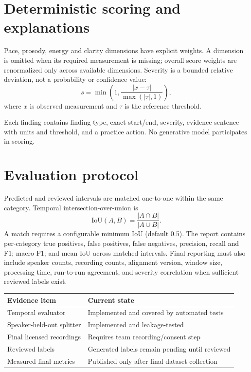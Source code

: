 \documentclass[10pt]{article}
\begin{document}
\section{Deterministic scoring and explanations}
Pace, prosody, energy and clarity dimensions have explicit weights. A dimension is omitted when its required measurement is missing; overall score weights are renormalized only across available dimensions. Severity is a bounded relative deviation, not a probability or confidence value:
\[
s=\min\left(1,\frac{|x-\tau|}{\max(|\tau|,1)}\right),
\]
where $x$ is observed measurement and $\tau$ is the reference threshold.

Each finding contains finding type, exact start/end, severity, evidence sentence with units and threshold, and a practice action. No generative model participates in scoring.

\newpage
\section{Evaluation protocol}
Predicted and reviewed intervals are matched one-to-one within the same category. Temporal intersection-over-union is
\[
\mathrm{IoU}(A,B)=\frac{|A\cap B|}{|A\cup B|}.
\]
A match requires a configurable minimum IoU (default 0.5). The report contains per-category true positives, false positives, false negatives, precision, recall and F1; macro F1; and mean IoU across matched intervals. Final reporting must also include speaker counts, recording counts, alignment version, window size, processing time, run-to-run agreement, and severity correlation when sufficient reviewed labels exist.

\begin{table}[h]
\centering
\begin{tabularx}{\textwidth}{lX}
\toprule
Evidence item & Current state \\
\midrule
Temporal evaluator & Implemented and covered by automated tests \\
Speaker-held-out splitter & Implemented and leakage-tested \\
Final licensed recordings & Requires team recording/consent step \\
Reviewed labels & Generated labels remain pending until reviewed \\
Measured final metrics & Published only after final dataset collection \\
\bottomrule
\end{tabularx}
\end{table}
\end{document}
